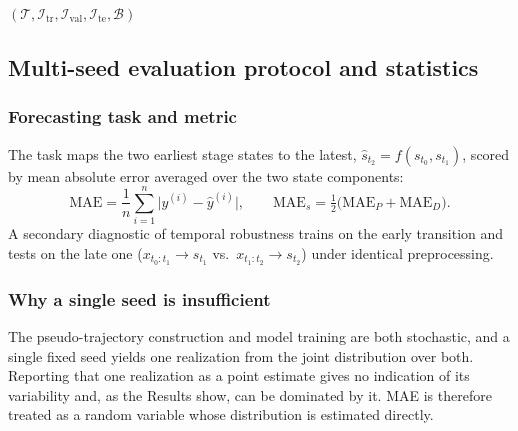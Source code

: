 \documentclass[10pt,letterpaper]{article}
\begin{document}
\begin{algorithm}[!htbp]
\BlankLine
{}
\BlankLine
\Return $(\mathcal{T},\mathcal{I}_{\mathrm{tr}},\mathcal{I}_{\mathrm{val}},\mathcal{I}_{\mathrm{te}},\mathcal{B})$
\end{algorithm}

\subsection*{Multi-seed evaluation protocol and statistics}
\label{subsec:protocol}

\subsubsection*{Forecasting task and metric}
The task maps the two earliest stage states to the latest, $\hat{s}_{t_2}=f(s_{t_0},s_{t_1})$, scored by mean absolute error averaged over the two state components:
\begin{equation}
\mathrm{MAE}=\frac{1}{n}\sum_{i=1}^{n}\big|y^{(i)}-\hat{y}^{(i)}\big|, \qquad
\mathrm{MAE}_{s}=\tfrac{1}{2}\big(\mathrm{MAE}_{P}+\mathrm{MAE}_{D}\big).
\label{eq:mae}
\end{equation}
A secondary diagnostic of temporal robustness trains on the early transition and tests on the late one ($x_{t_0:t_1}\!\rightarrow\!s_{t_1}$ vs.\ $x_{t_1:t_2}\!\rightarrow\!s_{t_2}$) under identical preprocessing.

\subsubsection*{Why a single seed is insufficient}
The pseudo-trajectory construction and model training are both stochastic, and a single fixed seed yields one realization from the joint distribution over both. Reporting that one realization as a point estimate gives no indication of its variability and, as the Results show, can be dominated by it. MAE is therefore treated as a random variable whose distribution is estimated directly.
\end{document}
